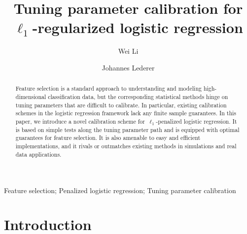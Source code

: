 \documentclass{elsarticle}
\begin{document}
\begin{frontmatter}

\title{Tuning parameter calibration for\\$\ell_1$-regularized logistic regression}

\author{Wei Li
}
\address{School of Mathematical Sciences, Peking University, Beijing,
China}

\author{Johannes Lederer}
\address{Departments of Statistics and Biostatistics, University of Washington, Seattle, WA, USA}

\begin{abstract}
Feature selection is a standard approach to understanding and modeling high-
dimensional classification data, but the corresponding statistical methods hinge on tuning parameters that are difficult to calibrate. In particular, existing calibration schemes in the logistic regression framework lack any finite sample guarantees. In this paper, we introduce a novel calibration scheme for~$\ell_1$-penalized logistic regression. It is based on simple tests along the tuning parameter path and is equipped with optimal  guarantees for feature selection. It is also amenable to easy and efficient implementations, and it rivals or outmatches existing methods in simulations and real data applications.
\end{abstract}

\begin{keyword}
Feature selection; Penalized logistic regression; Tuning parameter calibration
\end{keyword}

\end{frontmatter}
\pagestyle{empty}

\def\thefigure{\arabic{figure}}
\def\thetable{\arabic{table}}

\pagestyle{plain}
\def\n{\noindent}
\lhead[\fancyplain{} \leftmark]{}
\chead[]{}
\rhead[]{\fancyplain{}\rightmark}
\cfoot{}

\section{Introduction}
\label{sec:intro}
\end{document}
